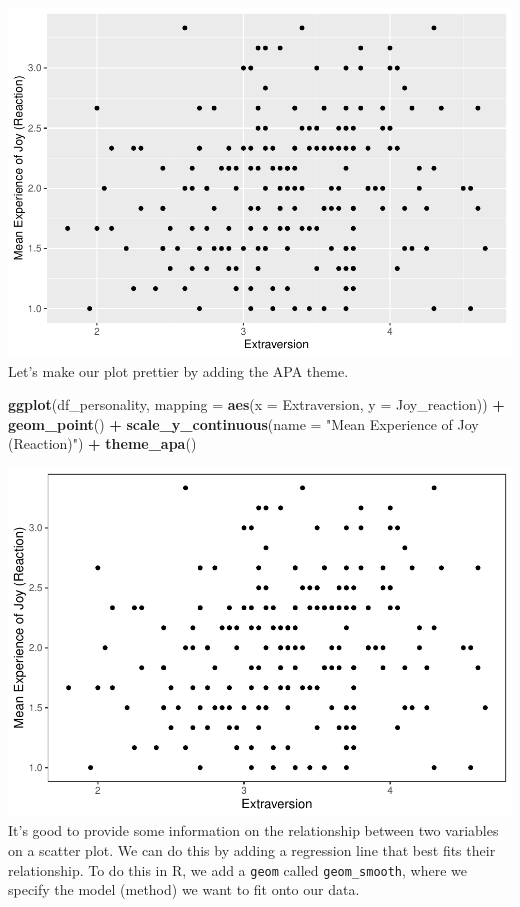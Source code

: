 \documentclass[
]{book}
\newenvironment{Shaded}{\begin{snugshade}}{\end{snugshade}}
\newcommand{\AttributeTok}[1]{\textcolor[rgb]{0.13,0.29,0.53}{#1}}
\newcommand{\FunctionTok}[1]{\textcolor[rgb]{0.13,0.29,0.53}{\textbf{#1}}}
\newcommand{\NormalTok}[1]{#1}
\newcommand{\SpecialCharTok}[1]{\textcolor[rgb]{0.81,0.36,0.00}{\textbf{#1}}}
\newcommand{\StringTok}[1]{\textcolor[rgb]{0.31,0.60,0.02}{#1}}
\begin{document}
\includegraphics{rintro_demo_files/figure-latex/unnamed-chunk-309-1.pdf}
Let's make our plot prettier by adding the APA theme.

\begin{Shaded}
\begin{Highlighting}[]
\FunctionTok{ggplot}\NormalTok{(df\_personality, }\AttributeTok{mapping =} \FunctionTok{aes}\NormalTok{(}\AttributeTok{x =}\NormalTok{ Extraversion, }\AttributeTok{y =}\NormalTok{ Joy\_reaction)) }\SpecialCharTok{+}
  \FunctionTok{geom\_point}\NormalTok{() }\SpecialCharTok{+}
  \FunctionTok{scale\_y\_continuous}\NormalTok{(}\AttributeTok{name =} \StringTok{"Mean Experience of Joy (Reaction)"}\NormalTok{) }\SpecialCharTok{+}
  \FunctionTok{theme\_apa}\NormalTok{()}
\end{Highlighting}
\end{Shaded}

\includegraphics{rintro_demo_files/figure-latex/unnamed-chunk-310-1.pdf}
It's good to provide some information on the relationship between two variables on a scatter plot. We can do this by adding a regression line that best fits their relationship. To do this in R, we add a \texttt{geom} called \texttt{geom\_smooth}, where we specify the model (method) we want to fit onto our data.
\end{document}
